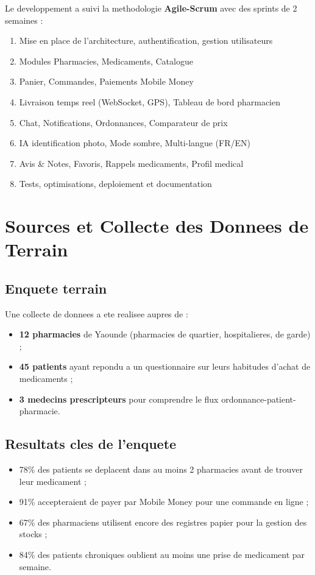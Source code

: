 \documentclass[12pt,a4paper]{report}
\begin{document}
Le developpement a suivi la methodologie \textbf{Agile-Scrum} avec des sprints de 2 semaines :

\begin{enumerate}[label=\textbf{Sprint \arabic*.},leftmargin=*]
    \item Mise en place de l'architecture, authentification, gestion utilisateurs
    \item Modules Pharmacies, Medicaments, Catalogue
    \item Panier, Commandes, Paiements Mobile Money
    \item Livraison temps reel (WebSocket, GPS), Tableau de bord pharmacien
    \item Chat, Notifications, Ordonnances, Comparateur de prix
    \item IA identification photo, Mode sombre, Multi-langue (FR/EN)
    \item Avis \& Notes, Favoris, Rappels medicaments, Profil medical
    \item Tests, optimisations, deploiement et documentation
\end{enumerate}

\section{Sources et Collecte des Donnees de Terrain}

\subsection{Enquete terrain}

Une collecte de donnees a ete realisee aupres de :
\begin{itemize}[label=\textcolor{vertpharma}{\textbullet}]
    \item \textbf{12 pharmacies} de Yaounde (pharmacies de quartier, hospitalieres, de garde) ;
    \item \textbf{45 patients} ayant repondu a un questionnaire sur leurs habitudes d'achat de medicaments ;
    \item \textbf{3 medecins prescripteurs} pour comprendre le flux ordonnance-patient-pharmacie.
\end{itemize}

\subsection{Resultats cles de l'enquete}

\begin{itemize}[label=\textcolor{vertpharma}{\textbullet}]
    \item 78\% des patients se deplacent dans au moins 2 pharmacies avant de trouver leur medicament ;
    \item 91\% accepteraient de payer par Mobile Money pour une commande en ligne ;
    \item 67\% des pharmaciens utilisent encore des registres papier pour la gestion des stocks ;
    \item 84\% des patients chroniques oublient au moins une prise de medicament par semaine.
\end{itemize}
\end{document}
